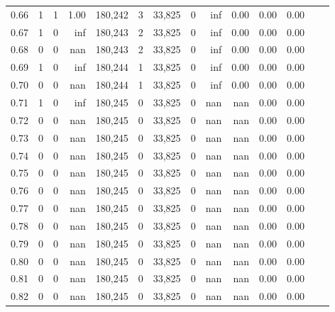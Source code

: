 \begin{tabular}{rrrrrrrrrrrrrr}
0.66 &       1 &      1 &    1.00 &  180,242 &        3 &  33,825 &       0 &   inf &  0.00 &  0.00 &      0.00 \\
0.67 &       1 &      0 &     inf &  180,243 &        2 &  33,825 &       0 &   inf &  0.00 &  0.00 &      0.00 \\
0.68 &       0 &      0 &     nan &  180,243 &        2 &  33,825 &       0 &   inf &  0.00 &  0.00 &      0.00 \\
0.69 &       1 &      0 &     inf &  180,244 &        1 &  33,825 &       0 &   inf &  0.00 &  0.00 &      0.00 \\
0.70 &       0 &      0 &     nan &  180,244 &        1 &  33,825 &       0 &   inf &  0.00 &  0.00 &      0.00 \\
0.71 &       1 &      0 &     inf &  180,245 &        0 &  33,825 &       0 &   nan &   nan &  0.00 &      0.00 \\
0.72 &       0 &      0 &     nan &  180,245 &        0 &  33,825 &       0 &   nan &   nan &  0.00 &      0.00 \\
0.73 &       0 &      0 &     nan &  180,245 &        0 &  33,825 &       0 &   nan &   nan &  0.00 &      0.00 \\
0.74 &       0 &      0 &     nan &  180,245 &        0 &  33,825 &       0 &   nan &   nan &  0.00 &      0.00 \\
0.75 &       0 &      0 &     nan &  180,245 &        0 &  33,825 &       0 &   nan &   nan &  0.00 &      0.00 \\
0.76 &       0 &      0 &     nan &  180,245 &        0 &  33,825 &       0 &   nan &   nan &  0.00 &      0.00 \\
0.77 &       0 &      0 &     nan &  180,245 &        0 &  33,825 &       0 &   nan &   nan &  0.00 &      0.00 \\
0.78 &       0 &      0 &     nan &  180,245 &        0 &  33,825 &       0 &   nan &   nan &  0.00 &      0.00 \\
0.79 &       0 &      0 &     nan &  180,245 &        0 &  33,825 &       0 &   nan &   nan &  0.00 &      0.00 \\
0.80 &       0 &      0 &     nan &  180,245 &        0 &  33,825 &       0 &   nan &   nan &  0.00 &      0.00 \\
0.81 &       0 &      0 &     nan &  180,245 &        0 &  33,825 &       0 &   nan &   nan &  0.00 &      0.00 \\
0.82 &       0 &      0 &     nan &  180,245 &        0 &  33,825 &       0 &   nan &   nan &  0.00 &      0.00 \\

\end{tabular}
